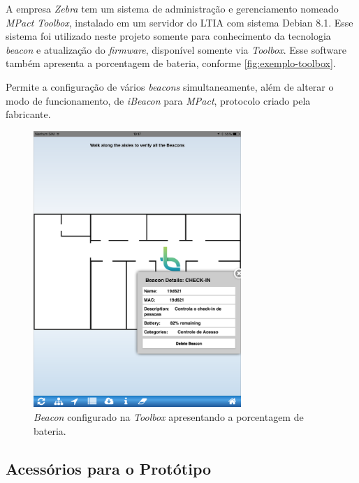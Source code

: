 A empresa \textit{Zebra} tem um sistema de administração e gerenciamento nomeado \textit{MPact Toolbox}, instalado em um servidor do LTIA com sistema Debian 8.1. Esse sistema foi utilizado neste projeto somente para conhecimento da tecnologia \textit{beacon} e atualização do \textit{firmware}, disponível somente via \textit{Toolbox}. Esse software também apresenta a porcentagem de bateria, conforme \autoref{fig:exemplo-toolbox}. 

Permite a configuração de vários \textit{beacons} simultaneamente, além de alterar o modo de funcionamento, de \textit{iBeacon} para \textit{MPact}, protocolo criado pela fabricante.

\begin{figure}[htb]
	\caption{\label{fig:exemplo-toolbox}\textit{Beacon} configurado na \textit{Toolbox} apresentando a porcentagem de bateria.}
	\begin{center}
		\includegraphics[width=0.7\textwidth]{img/toolbox-exemplo.png}
	\end{center}
\end{figure}

\subsection{Acessórios para o Protótipo}\label{sec:acess-prototipo}

